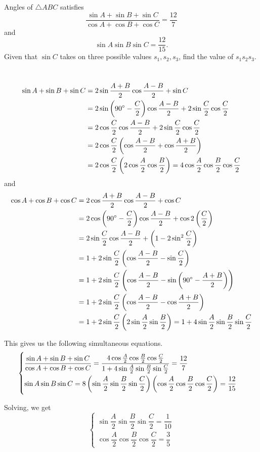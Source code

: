\begin{prbm}
Angles of $\triangle ABC$ satisfies
\[ \frac{\sin A+\sin B+\sin C}{\cos A+\cos B+\cos C}=\frac{12}{7} \]
and
\[ \sin A\sin B\sin C=\frac{12}{15}. \]
Given that $\sin C$ takes on three possible values $s_1,s_2,s_3$, find the value of $s_1s_2s_3$.
\end{prbm}
\begin{solution} \
\begin{align*}
\sin A+\sin B+\sin C
&= 2\sin\frac{A+B}{2}\cos\frac{A-B}{2}+\sin C \\
&= 2\sin\left(90\degree-\frac{C}{2}\right)\cos\frac{A-B}{2}+2\sin\frac{C}{2}\cos\frac{C}{2} \\
&= 2\cos\frac{C}{2}\cos\frac{A-B}{2}+2\sin\frac{C}{2}\cos\frac{C}{2} \\
&= 2\cos\frac{C}{2}\left(\cos\frac{A-B}{2}+\cos\frac{A+B}{2}\right) \\
&= 2\cos\frac{C}{2}\left(2\cos\frac{A}{2}\cos\frac{B}{2}\right) 
= 4\cos\frac{A}{2}\cos\frac{B}{2}\cos\frac{C}{2}
\end{align*}
and
\begin{align*}
\cos A+\cos B+\cos C
&= 2\cos\frac{A+B}{2}\cos\frac{A-B}{2}+\cos C \\
&= 2\cos\left(90\degree-\frac{C}{2}\right)\cos\frac{A-B}{2}+\cos2\left(\frac{C}{2}\right) \\
&= 2\sin\frac{C}{2}\cos\frac{A-B}{2}+\left(1-2\sin^2\frac{C}{2}\right) \\
&= 1+2\sin\frac{C}{2}\left(\cos\frac{A-B}{2}-\sin\frac{C}{2}\right) \\
&= 1+2\sin\frac{C}{2}\left(\cos\frac{A-B}{2}-\sin\left(90\degree-\frac{A+B}{2}\right)\right) \\
&= 1+2\sin\frac{C}{2}\left(\cos\frac{A-B}{2}-\cos\frac{A+B}{2}\right) \\
&= 1+2\sin\frac{C}{2}\left(2\sin\frac{A}{2}\sin\frac{B}{2}\right) 
= 1+4\sin\frac{A}{2}\sin\frac{B}{2}\sin\frac{C}{2}
\end{align*}

This gives us the following simultaneous equations.
\[ \begin{cases}
\dfrac{\sin A+\sin B+\sin C}{\cos A+\cos B+\cos C} = \dfrac{4\cos\frac{A}{2}\cos\frac{B}{2}\cos\frac{C}{2}}{1+4\sin\frac{A}{2}\sin\frac{B}{2}\sin\frac{C}{2}} = \dfrac{12}{7} \\[1em]
\sin A\sin B\sin C = 8\left(\sin\dfrac{A}{2}\sin\dfrac{B}{2}\sin\dfrac{C}{2}\right)\left(\cos\dfrac{A}{2}\cos\dfrac{B}{2}\cos\dfrac{C}{2}\right) = \dfrac{12}{15}
\end{cases} \]

Solving, we get
\[ \begin{cases}
\sin\dfrac{A}{2}\sin\dfrac{B}{2}\sin\dfrac{C}{2}=\dfrac{1}{10} \\[1em]
\cos\dfrac{A}{2}\cos\dfrac{B}{2}\cos\dfrac{C}{2}=\dfrac{3}{5}
\end{cases} \]


\end{solution}
